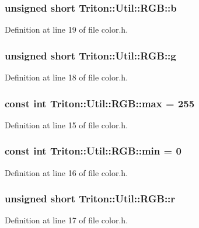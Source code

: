 \subsubsection[{b}]{\setlength{\rightskip}{0pt plus 5cm}unsigned short Triton\+::\+Util\+::\+R\+G\+B\+::b}\label{group__lus__color_gadac238b0db4b4534cfa592331234b403}


Definition at line 19 of file color.\+h.

\hypertarget{group__lus__color_ga595248e981b342dfdeb08dc85f190229}{}
\subsubsection[{g}]{\setlength{\rightskip}{0pt plus 5cm}unsigned short Triton\+::\+Util\+::\+R\+G\+B\+::g}\label{group__lus__color_ga595248e981b342dfdeb08dc85f190229}


Definition at line 18 of file color.\+h.

\hypertarget{group__lus__color_ga25c01b9de0c18136b41333c426c2b226}{}
\subsubsection[{max}]{\setlength{\rightskip}{0pt plus 5cm}const int Triton\+::\+Util\+::\+R\+G\+B\+::max = 255}\label{group__lus__color_ga25c01b9de0c18136b41333c426c2b226}


Definition at line 15 of file color.\+h.

\hypertarget{group__lus__color_gaf4323053c0ecc091d206864ca2bbd26e}{}
\subsubsection[{min}]{\setlength{\rightskip}{0pt plus 5cm}const int Triton\+::\+Util\+::\+R\+G\+B\+::min = 0}\label{group__lus__color_gaf4323053c0ecc091d206864ca2bbd26e}


Definition at line 16 of file color.\+h.

\hypertarget{group__lus__color_ga1fcfba2ad564a76d12f72f4b7441b3dc}{}
\subsubsection[{r}]{\setlength{\rightskip}{0pt plus 5cm}unsigned short Triton\+::\+Util\+::\+R\+G\+B\+::r}\label{group__lus__color_ga1fcfba2ad564a76d12f72f4b7441b3dc}


Definition at line 17 of file color.\+h.

